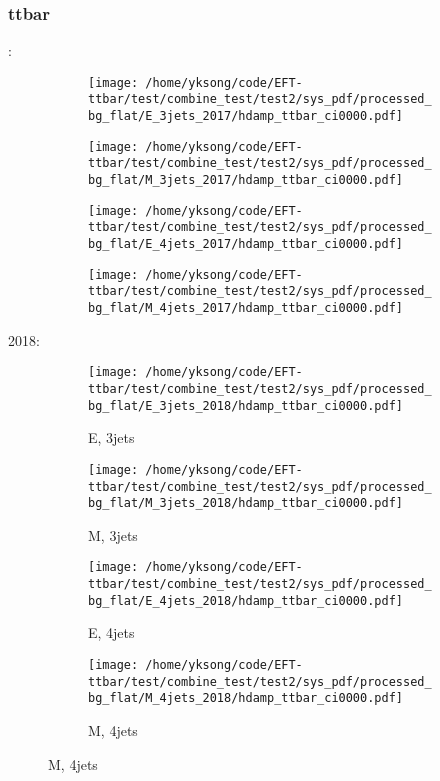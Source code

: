 \documentclass{beamer}
\begin{document}
\begin{frame}
\frametitle{ttbar}
\fontsize{5}{1}:
\begin{figure}
\centering
\begin{subfigure}[b]{0.24\textwidth}
\texttt{[image: /home/yksong/code/EFT-ttbar/test/combine\_test/test2/sys\_pdf/processed\_bg\_flat/E\_3jets\_2017/hdamp\_ttbar\_ci0000.pdf]}
\end{subfigure}
\begin{subfigure}[b]{0.24\textwidth}
\texttt{[image: /home/yksong/code/EFT-ttbar/test/combine\_test/test2/sys\_pdf/processed\_bg\_flat/M\_3jets\_2017/hdamp\_ttbar\_ci0000.pdf]}
\end{subfigure}
\begin{subfigure}[b]{0.24\textwidth}
\texttt{[image: /home/yksong/code/EFT-ttbar/test/combine\_test/test2/sys\_pdf/processed\_bg\_flat/E\_4jets\_2017/hdamp\_ttbar\_ci0000.pdf]}
\end{subfigure}
\begin{subfigure}[b]{0.24\textwidth}
\texttt{[image: /home/yksong/code/EFT-ttbar/test/combine\_test/test2/sys\_pdf/processed\_bg\_flat/M\_4jets\_2017/hdamp\_ttbar\_ci0000.pdf]}
\end{subfigure}
\end{figure}
2018:
\begin{figure}
\centering
\begin{subfigure}[b]{0.24\textwidth}
\texttt{[image: /home/yksong/code/EFT-ttbar/test/combine\_test/test2/sys\_pdf/processed\_bg\_flat/E\_3jets\_2018/hdamp\_ttbar\_ci0000.pdf]}
\captionsetup{font=tiny}
\caption{E, 3jets}
\end{subfigure}
\begin{subfigure}[b]{0.24\textwidth}
\texttt{[image: /home/yksong/code/EFT-ttbar/test/combine\_test/test2/sys\_pdf/processed\_bg\_flat/M\_3jets\_2018/hdamp\_ttbar\_ci0000.pdf]}
\captionsetup{font=tiny}
\caption{M, 3jets}
\end{subfigure}
\begin{subfigure}[b]{0.24\textwidth}
\texttt{[image: /home/yksong/code/EFT-ttbar/test/combine\_test/test2/sys\_pdf/processed\_bg\_flat/E\_4jets\_2018/hdamp\_ttbar\_ci0000.pdf]}
\captionsetup{font=tiny}
\caption{E, 4jets}
\end{subfigure}
\begin{subfigure}[b]{0.24\textwidth}
\texttt{[image: /home/yksong/code/EFT-ttbar/test/combine\_test/test2/sys\_pdf/processed\_bg\_flat/M\_4jets\_2018/hdamp\_ttbar\_ci0000.pdf]}
\captionsetup{font=tiny}
\caption{M, 4jets}
\end{subfigure}
\end{figure}
\end{frame}
\end{document}
